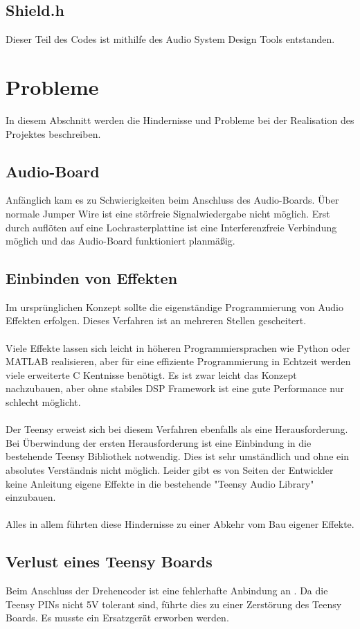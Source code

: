 \documentclass[12pt]{article}
\begin{document}
\subsection{Shield.h}
Dieser Teil des Codes ist mithilfe des Audio System Design Tools entstanden. 


\section{Probleme}
In diesem Abschnitt werden die Hindernisse und Probleme bei der Realisation des Projektes beschreiben.
\subsection{Audio-Board}
Anfänglich kam es zu Schwierigkeiten beim Anschluss des Audio-Boards. Über normale Jumper Wire ist eine störfreie Signalwiedergabe nicht möglich. 
Erst durch auflöten auf eine Lochrasterplattine ist eine Interferenzfreie Verbindung möglich und das Audio-Board funktioniert planmäßig.
\subsection{Einbinden von Effekten}
Im ursprünglichen Konzept sollte die eigenständige Programmierung von Audio Effekten erfolgen. 
Dieses Verfahren ist an mehreren Stellen gescheitert. 
\\
\\
Viele Effekte lassen sich leicht in höheren Programmiersprachen
wie Python oder MATLAB realisieren, aber für eine effiziente Programmierung in Echtzeit werden viele erweiterte C Kentnisse benötigt. 
Es ist zwar leicht das Konzept nachzubauen, aber ohne stabiles DSP Framework ist eine gute 
Performance nur schlecht möglicht. 
\\
\\
Der Teensy erweist sich bei diesem Verfahren ebenfalls als eine Herausforderung. Bei Überwindung der ersten Herausforderung 
ist eine Einbindung in die bestehende Teensy Bibliothek notwendig. Dies ist sehr umständlich und ohne ein absolutes Verständnis nicht möglich. 
Leider gibt es von Seiten der Entwickler keine Anleitung eigene Effekte in die bestehende "Teensy Audio Library" einzubauen. 
\\
\\
Alles in allem führten diese Hindernisse zu einer Abkehr vom Bau eigener Effekte.  
\subsection{Verlust eines Teensy Boards}
Beim Anschluss der Drehencoder ist eine fehlerhafte Anbindung an . 
Da die Teensy PINs nicht 5V tolerant sind, führte dies zu einer Zerstörung des Teensy Boards.
Es musste ein Ersatzgerät erworben werden. 
\end{document}

